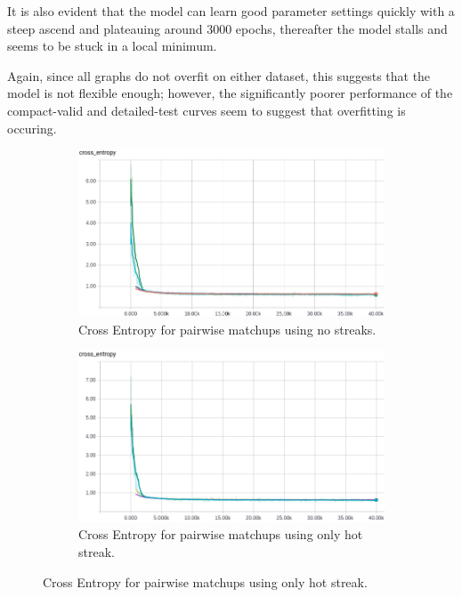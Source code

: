 \documentclass{article} %
\begin{document}
It is also evident that the model can learn good parameter settings quickly with a steep ascend and plateauing around 3000 epochs, thereafter the model stalls and seems to be stuck in a local minimum.

Again, since all graphs do not overfit on either dataset, this suggests that the model is not flexible enough; however, the significantly poorer performance of the compact-valid and detailed-test curves seem to suggest that overfitting is occuring.


\begin{figure}[!htb]
  \begin{subfigure}{0.5\textwidth}
    \includegraphics[width=\linewidth]{plots/model1/pairwise-matchups/streak-/crossentropy.png}
    \caption{Cross Entropy for pairwise matchups using no streaks.}\label{fig:pairwise--crossentropy}
  \end{subfigure}
  \begin{subfigure}{0.5\textwidth}
    \includegraphics[width=\linewidth]{plots/model1/pairwise-matchups/streak-h/crossentropy.png}
    \caption{Cross Entropy for pairwise matchups using only hot streak.}\label{fig:pairwise-h-crossentropy}
  \end{subfigure}



\end{figure}
\end{document}
